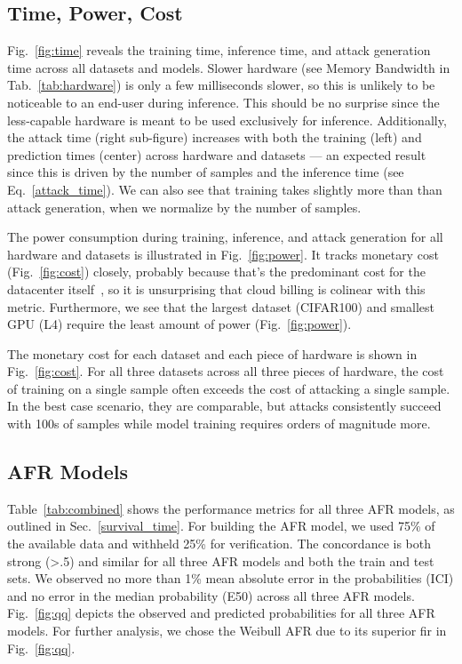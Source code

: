 \documentclass[journal]{IEEEtran}
\begin{document}
\subsection{Time, Power, Cost}
\label{res:cost}
Fig.~\ref{fig:time} reveals the training time, inference time, and attack generation time across all datasets and models. Slower hardware (see Memory Bandwidth in Tab.~\ref{tab:hardware}) is only a few milliseconds slower, so this is unlikely to be noticeable to an end-user during inference. This should be no surprise since the less-capable hardware is meant to be used exclusively for inference. Additionally, the attack time (right sub-figure) increases with both the training (left) and prediction times (center) across hardware and datasets --- an expected result since this is driven by the number of samples and the inference time (see Eq.~\ref{attack_time}). We can also see that training takes slightly more than than attack generation, when we normalize by the number of samples.

The power consumption during training, inference, and attack generation for all hardware and datasets is illustrated in Fig.~\ref{fig:power}. It tracks monetary cost (Fig.~\ref{fig:cost}) closely, probably because that's the predominant cost for the datacenter itself~\cite{dayarathna2015data}, so it is unsurprising that cloud billing is colinear with this metric. Furthermore, we see that the largest dataset (CIFAR100) and smallest GPU (L4) require the least amount of power (Fig.~\ref{fig:power}). 

The monetary cost for each dataset and each piece of hardware is shown in Fig.~\ref{fig:cost}. For all three datasets across all three pieces of hardware, the cost of training on a single sample often exceeds the cost of attacking a single sample. In the best case scenario, they are comparable, but attacks consistently succeed with 100s of samples while model training requires orders of magnitude more.

\subsection{AFR Models}
\label{res:afr}
Table~\ref{tab:combined} shows the performance metrics for all three AFR models, as outlined in Sec.~\ref{survival_time}. For building the AFR model, we used 75\% of the available data and withheld 25\% for verification. The concordance is both strong (>.5) and similar for all three AFR models and both the train and test sets. We observed no more than 1\% mean absolute error in the probabilities (ICI) and no error in the median probability (E50) across all three AFR models. Fig.~\ref{fig:qq} depicts the observed and predicted probabilities for all three AFR models. For further analysis, we chose the Weibull AFR due to its superior fir in  Fig.~\ref{fig:qq}.

\end{document}
